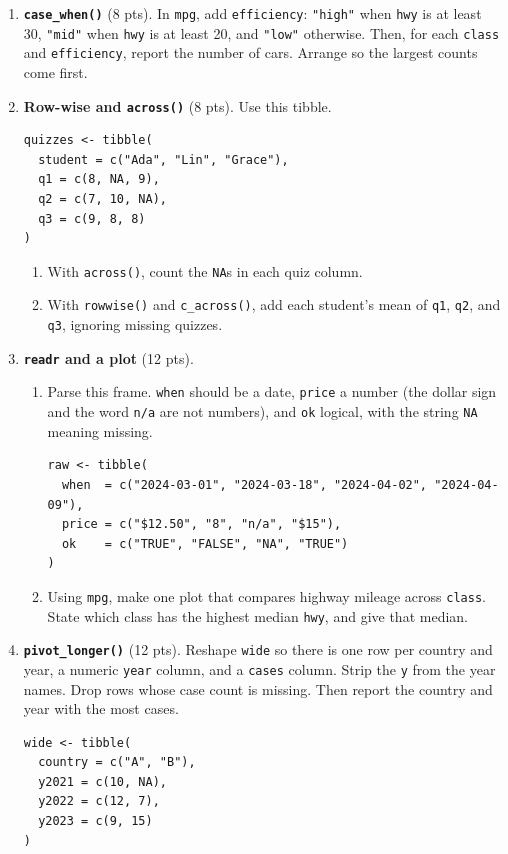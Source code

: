 \documentclass[11pt]{article}
\begin{document}
\begin{enumerate}
\item \textbf{\texttt{case\_when()}} (8 pts).
In \texttt{mpg}, add \texttt{efficiency}: \texttt{"high"} when
\texttt{hwy} is at least 30, \texttt{"mid"} when \texttt{hwy} is at
least 20, and \texttt{"low"} otherwise.
Then, for each \texttt{class} and \texttt{efficiency}, report the
number of cars. Arrange so the largest counts come first.

\item \textbf{Row-wise and \texttt{across()}} (8 pts).
Use this tibble.

\begin{lstlisting}
quizzes <- tibble(
  student = c("Ada", "Lin", "Grace"),
  q1 = c(8, NA, 9),
  q2 = c(7, 10, NA),
  q3 = c(9, 8, 8)
)
\end{lstlisting}

\begin{enumerate}
\item With \texttt{across()}, count the \texttt{NA}s in each quiz column.
\item With \texttt{rowwise()} and \texttt{c\_across()}, add each
student's mean of \texttt{q1}, \texttt{q2}, and \texttt{q3}, ignoring
missing quizzes.
\end{enumerate}

\item \textbf{\texttt{readr} and a plot} (12 pts).

\begin{enumerate}
\item Parse this frame. \texttt{when} should be a date, \texttt{price}
a number (the dollar sign and the word \texttt{n/a} are not numbers),
and \texttt{ok} logical, with the string \verb|NA| meaning missing.
\begin{lstlisting}
raw <- tibble(
  when  = c("2024-03-01", "2024-03-18", "2024-04-02", "2024-04-09"),
  price = c("$12.50", "8", "n/a", "$15"),
  ok    = c("TRUE", "FALSE", "NA", "TRUE")
)
\end{lstlisting}
\item Using \texttt{mpg}, make one plot that compares highway mileage
across \texttt{class}. State which class has the highest median
\texttt{hwy}, and give that median.
\end{enumerate}

\item \textbf{\texttt{pivot\_longer()}} (12 pts).
Reshape \texttt{wide} so there is one row per country and year, a
numeric \texttt{year} column, and a \texttt{cases} column.
Strip the \texttt{y} from the year names. Drop rows whose case count
is missing. Then report the country and year with the most cases.

\begin{lstlisting}
wide <- tibble(
  country = c("A", "B"),
  y2021 = c(10, NA),
  y2022 = c(12, 7),
  y2023 = c(9, 15)
)
\end{lstlisting}
\end{enumerate}
\end{document}
